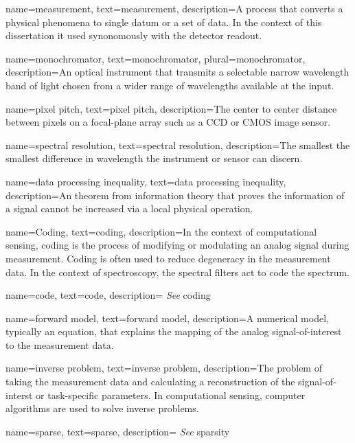 {
name={measurement},
text={measurement},
description={A process that converts a physical phenomena to single datum or a set of data. In the context of this dissertation it used synonomously with the detector readout.}
}

{
name={monochromator},
text={monochromator},
plural={monochromator},
description={An optical instrument that transmits a selectable narrow wavelength band of light chosen from a wider range of wavelengths available at the input.}
}

{
name={pixel pitch},
text={pixel pitch},
description={The center to center distance between pixels on a focal-plane array such as a CCD or CMOS image sensor.}
}

{
name={spectral resolution},
text={spectral resolution},
description={The smallest the smallest difference in wavelength the instrument or sensor can discern.}
}

{
name={data processing inequality},
text={data processing inequality},
description={An theorem from information theory that proves the information of a signal cannot be increased via a local physical operation.}
}

{
name={Coding},
text={coding},
description={In the context of computational sensing, coding is the process of modifying or modulating an analog signal during measurement. Coding is often used to reduce degeneracy in the measurement data. In the context of spectroscopy, the spectral filters act to code the spectrum.  }
}

{
name={code},
text={code},
description={ \emph{See} \gls{coding}}
}

{
name={forward model},
text={forward model},
description={A numerical model, typically an equation, that explains the mapping of the analog signal-of-interest to the measurement data.}
}

{
name={inverse problem},
text={inverse problem},
description={The problem of taking the measurement data and calculating a reconstruction of the signal-of-interst or task-specific parameters. In computational sensing, computer algorithms are used to solve inverse problems.}
}

{
name={sparse},
text={sparse},
description={ \emph{See} \gls{sparsity}}
}

